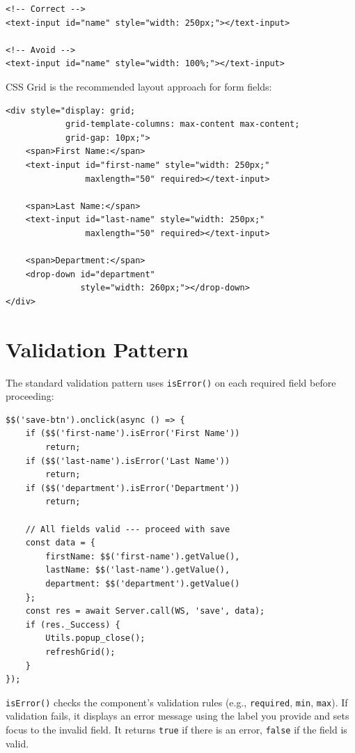 \begin{lstlisting}[style=html]
<!-- Correct -->
<text-input id="name" style="width: 250px;"></text-input>

<!-- Avoid -->
<text-input id="name" style="width: 100%;"></text-input>
\end{lstlisting}

\noindent
CSS Grid is the recommended layout approach for form fields:

\begin{lstlisting}[style=html]
<div style="display: grid;
            grid-template-columns: max-content max-content;
            grid-gap: 10px;">
    <span>First Name:</span>
    <text-input id="first-name" style="width: 250px;"
                maxlength="50" required></text-input>

    <span>Last Name:</span>
    <text-input id="last-name" style="width: 250px;"
                maxlength="50" required></text-input>

    <span>Department:</span>
    <drop-down id="department"
               style="width: 260px;"></drop-down>
</div>
\end{lstlisting}

\section{Validation Pattern}
\label{sec:comp-validation}

The standard validation pattern uses \texttt{isError()} on each required field before proceeding:

\begin{lstlisting}[style=javascript]
$$('save-btn').onclick(async () => {
    if ($$('first-name').isError('First Name'))
        return;
    if ($$('last-name').isError('Last Name'))
        return;
    if ($$('department').isError('Department'))
        return;

    // All fields valid --- proceed with save
    const data = {
        firstName: $$('first-name').getValue(),
        lastName: $$('last-name').getValue(),
        department: $$('department').getValue()
    };
    const res = await Server.call(WS, 'save', data);
    if (res._Success) {
        Utils.popup_close();
        refreshGrid();
    }
});
\end{lstlisting}

\noindent
\texttt{isError()} checks the component's validation rules (e.g., \texttt{required}, \texttt{min}, \texttt{max}).  If validation fails, it displays an error message using the label you provide and sets focus to the invalid field.  It returns \texttt{true} if there is an error, \texttt{false} if the field is valid.
